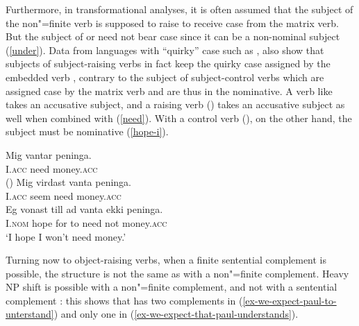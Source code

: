 \documentclass[output=paper
	        ,collection
	        ,collectionchapter
 	        ,biblatex
                ,babelshorthands
                ,newtxmath
                ,draftmode
                ,colorlinks, citecolor=brown
]{langscibook}
\begin{document}
\eal
{}
\zl
\eal
{}
\zl

Furthermore, in transformational analyses, it is often assumed that the subject of the non"=finite verb  is supposed to raise to receive case from the matrix verb.
 But the subject of  or  need not bear case  since it can be a non-nominal subject (\ref{under}).
Data from languages with ``quirky'' case such as , also show that subjects of subject-raising verbs in fact keep the quirky case assigned by the embedded verb  \citep{Zaenenetal1985}, contrary to the subject of subject-control verbs which are assigned case by the matrix verb and are thus in the nominative. A verb like  takes an accusative subject, and a raising verb () takes an accusative subject as well when combined with  (\ref{need}). With a control verb (), on the other hand, the subject must be nominative (\ref{hope-i}).

\eal
\ex 
\gll Mig vantar peninga.\footnotemark\\
     I.\textsc{acc} need money.\textsc{acc} \\\hfill()
\ex 
\gll Mig virdast vanta peninga. \label{need} \\
     I.\textsc{acc} seem need money.\textsc{acc} \\
\ex 
\gll Eg vonast till ad vanta ekki peninga. \label{hope-i} \\
     I.\textsc{nom} hope for to need not money.\textsc{acc} \\
\glt `I hope I won't need money.'
\zl

Turning now to object-raising verbs, when a finite sentential complement is possible, the structure
is not the same as  with a non"=finite complement. Heavy NP shift is possible with a non"=finite
complement, and not with a sentential complement \parencites[]{Bresnan1982}[]{PollardandSag1994}: this shows that  has two complements in (\ref{ex-we-expect-paul-to-unterstand}) and only one in (\ref{ex-we-expect-that-paul-understands}).
\end{document}
